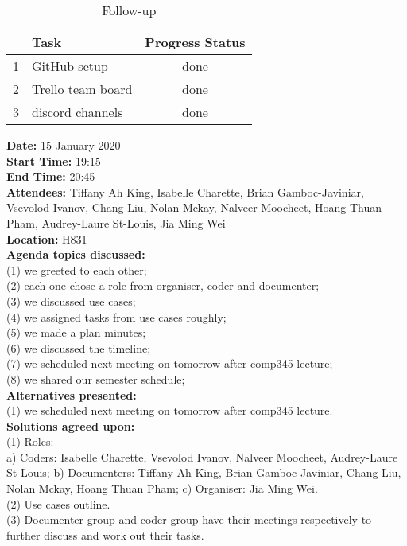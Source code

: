 \documentclass[12pt]{article}
\begin{document}
\begin{table}[h!]
\centering
 \begin{tabular}{||l l c ||} 
 \hline
   & Task & Progress Status\\ [0.5ex] 
 \hline\hline
 1 & GitHub setup & done \\ 
 2 & Trello team board& done\\
 3 & discord channels & done\\[1ex] 

 \hline
 \end{tabular}
\caption{Follow-up }
\label{table:1}
\end{table}

\newpage
{\bf Date:} 15 January 2020\\
{\bf Start Time:} 19:15\\
{\bf End Time:}  20:45\\
{\bf Attendees:} Tiffany Ah King,
Isabelle Charette,
Brian Gamboc-Javiniar,
Vsevolod Ivanov,
Chang Liu,
Nolan Mckay,
Nalveer Moocheet,
Hoang Thuan Pham,
Audrey-Laure St-Louis,
Jia Ming Wei\\
{\bf Location:} H831\\
{\bf Agenda topics discussed:} \\
 (1) we greeted to each other; \\(2) each one chose a role from organiser, coder and documenter; \\(3) we discussed use cases; \\(4) we assigned tasks from use cases roughly; \\(5) we made a plan minutes; \\(6) we discussed the timeline; \\(7) we scheduled next meeting on tomorrow after comp345 lecture; \\(8) we shared our semester schedule; \\
{\bf Alternatives presented:} \\(1) we scheduled next meeting on tomorrow after comp345 lecture.\\
{\bf Solutions agreed upon:} \\(1) Roles:\\a) Coders:
Isabelle Charette,
Vsevolod Ivanov,
Nalveer Moocheet,
Audrey-Laure St-Louis; 
b) Documenters: 
Tiffany Ah King,
Brian Gamboc-Javiniar,
Chang Liu,
Nolan Mckay,
Hoang Thuan Pham;
c) Organiser: Jia Ming Wei.
\\(2) Use cases outline. 
\\(3) Documenter group and coder group have their meetings respectively to further discuss and work out their tasks. \\
\end{document}
